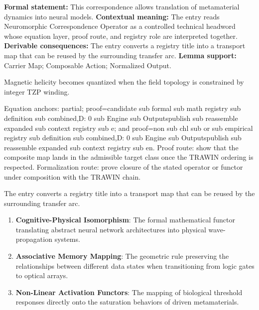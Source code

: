 \begingroup\footnotesize\setlength{\emergencystretch}{3em}\sloppy
\textbf{Formal statement:} This correspondence allows translation of metamaterial dynamics into neural models. \textbf{Contextual meaning:} The entry reads Neuromorphic Correspondence Operator as a controlled technical headword whose equation layer, proof route, and registry role are interpreted together. \textbf{Derivable consequences:} The entry converts a registry title into a transport map that can be reused by the surrounding transfer arc. \textbf{Lemma support:} Carrier Map; Composable Action; Normalized Output.\par
\endgroup

Magnetic helicity becomes quantized when the field topology is constrained by integer TZP winding.

Equation anchors: partial; proof=candidate sub formal sub math registry sub definition sub combined,D: 0 sub Engine sub Outputspublish sub reassemble expanded sub context registry sub e; and proof=non sub chl sub or sub empirical registry sub definition sub combined,D: 0 sub Engine sub Outputspublish sub reassemble expanded sub context registry sub en. Proof route: show that the composite map lands in the admissible target class once the TRAWIN ordering is respected. Formalization route: prove closure of the stated operator or functor under composition with the TRAWIN chain.

The entry converts a registry title into a transport map that can be reused by the surrounding transfer arc.
\endgroup

\begin{enumerate}[leftmargin=1.6em,itemsep=6pt,topsep=4pt]
\item \textbf{Cognitive-Physical Isomorphism}: The formal mathematical functor translating abstract neural network architectures into physical wave-propagation systems.
\item \textbf{Associative Memory Mapping}: The geometric rule preserving the relationships between different data states when transitioning from logic gates to optical arrays.
\item \textbf{Non-Linear Activation Functors}: The mapping of biological threshold responses directly onto the saturation behaviors of driven metamaterials.
\end{enumerate}

